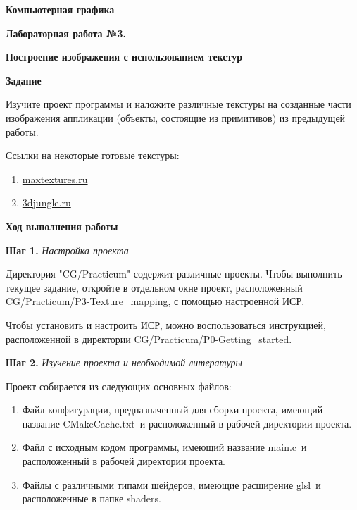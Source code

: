 \documentclass[a4paper,12pt]{article}
\begin{document}
\fontsize{14pt}{16pt}\selectfont
\begin{center}
    \textbf{{\Large Компьютерная графика}}
    
    \textbf{{\large Лабораторная работа №3. }}
    
    \textbf{{\large Построение изображения с использованием текстур}}
    \end{center}
    
    
    \textbf{Задание}
    
    Изучите проект программы и наложите различные текстуры на созданные части изображения аппликации (объекты, состоящие из примитивов) из предыдущей работы.
    
    Ссылки на некоторые готовые текстуры:
    \begin{enumerate}
        \item \href{https://maxtextures.ru/katalog-tekstur.html}{maxtextures.ru}
        \item \href{https://3djungle.ru/textures/}{3djungle.ru}
    \end{enumerate}
    
    \textbf{Ход выполнения работы}
    
    \textbf{Шаг 1.} \textit{Настройка проекта}
    
    Директория "CG/Practicum" содержит различные проекты. Чтобы выполнить текущее задание, откройте в отдельном окне проект, расположенный \textquotedbl CG/Practicum/P3-Texture\_mapping\textquotedbl, с помощью настроенной ИСР.

    Чтобы установить и настроить ИСР, можно воспользоваться инструкцией, расположенной в директории 
    \textquotedbl CG/Practicum/P0-Getting\_started\textquotedbl .
    
    \textbf{Шаг 2.} \textit{Изучение проекта и необходимой литературы}
    
    Проект собирается из следующих основных файлов:
    
    \begin{enumerate}
        \item Файл конфигурации, предназначенный для сборки проекта, имеющий название \textquotedbl CMakeCache.txt\textquotedbl~и расположенный в рабочей директории проекта.
        \item Файл с исходным кодом программы, имеющий название \textquotedbl main.c\textquotedbl~и расположенный в рабочей директории проекта.
        \item Файлы с различными типами шейдеров, имеющие расширение \textquotedbl glsl\textquotedbl~и расположенные в папке \textquotedbl shaders\textquotedbl.
    \end{enumerate}
    
\end{document}
